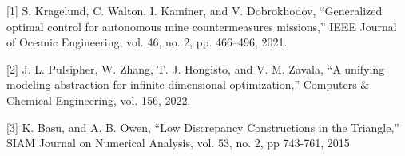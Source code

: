 \documentclass[12pt,a4paper,figuresright]{book}
\begin{document}
\vspace{-0.8cm}
[1] S. Kragelund, C. Walton, I. Kaminer, and V. Dobrokhodov, “Generalized optimal control for autonomous mine countermeasures missions,” IEEE Journal of Oceanic Engineering, vol. 46, no. 2, pp. 466–496, 2021.

[2] J. L. Pulsipher, W. Zhang, T. J. Hongisto, and V. M. Zavala, “A unifying modeling abstraction for infinite-dimensional optimization,” Computers \& Chemical Engineering, vol. 156, 2022.

[3] K. Basu, and A. B. Owen, “Low Discrepancy Constructions in the Triangle,” SIAM Journal on Numerical Analysis, vol. 53, no. 2, pp 743-761, 2015
\end{document}
